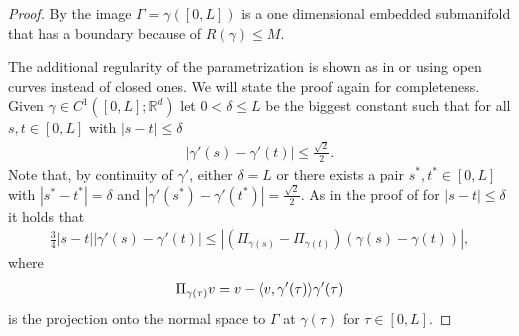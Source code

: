 \documentclass{article}
\def\R{{\mathbb R}}
\DeclarePairedDelimiter{\skp}{\langle}{\rangle}
\begin{document}
\begin{proof} 
    By \cite[Theorem 1.1]{STRZELECKI_2012} the image $\Gamma = \gamma([0,L])$ is a one dimensional embedded submanifold that has a boundary because of $R(\gamma)\leq M$.

    The additional regularity of the parametrization is shown as in \cite[Section 2]{Blatt2013} or \cite[Proposition 2.5]{blatt_regularity_2012} using open curves instead of closed ones. We will state the proof again for completeness.
    Given $\gamma \in C^{1}([0,L];\R^d)$ let $0<\delta \leq L$ be the biggest constant such that for all $s,t\in[0,L]$ with $|s-t|\leq \delta$
    \begin{align*}
        |\gamma'(s) - \gamma'(t)| \leq \frac{\sqrt{2}}{2} .
    \end{align*}
    Note that, by continuity of $\gamma'$, either $\delta=L$ or there exists a pair $s^*,t^*\in[0,L]$ with $|s^*-t^*| = \delta$ and $|\gamma'(s^*) - \gamma'(t^*) | = \frac{\sqrt{2}}{2}$. As in the proof of \cite[Proposition 2.5]{blatt_regularity_2012} for $|s-t|\leq \delta$ it holds that
    {\begin{align}
       \frac{3}{4} |s-t| |\gamma'(s) - \gamma'(t)| \leq |\left(\Pi_{\gamma(s)} - \Pi_{\gamma(t)}\right)(\gamma(s) - \gamma(t))|, %
    \end{align}
    }
    where
    \begin{align}
    \Pi_{\gamma(\tau)}v = v - \skp{v, \gamma'(\tau)}\gamma'(\tau)
    \end{align}
    is the projection onto the normal space to $\Gamma$ at $\gamma(\tau)$ for $\tau\in[0,L]$.
    

\end{proof}
\end{document}

